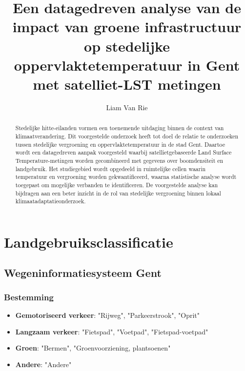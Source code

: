 \documentclass{hogent-article}
\title{Een datagedreven analyse van de impact van groene infrastructuur op stedelijke oppervlaktetemperatuur in Gent met satelliet-LST metingen}
\author{Liam Van Rie}
\begin{document}
\begin{abstract}
  Stedelijke hitte-eilanden vormen een toenemende uitdaging binnen de context van klimaatverandering.
  Dit voorgestelde onderzoek heeft tot doel de relatie te onderzoeken tussen stedelijke vergroening en 
  oppervlaktetemperatuur in de stad Gent. 
  Daartoe wordt een datagedreven aanpak voorgesteld waarbij satellietgebaseerde Land Surface Temperature-metingen
  worden gecombineerd met gegevens over boomdensiteit en landgebruik.
  Het studiegebied wordt opgedeeld in ruimtelijke cellen waarin temperatuur en vergroening worden gekwantificeerd, 
  waarna statistische analyse wordt toegepast om mogelijke verbanden te identificeren.
  De voorgestelde analyse kan bijdragen aan een beter inzicht in de rol van stedelijke vergroening 
  binnen lokaal klimaatadaptatieonderzoek.
\end{abstract}

\tableofcontents


\printbibliography[heading=bibintoc]


\newpage

\appendix

\section{Landgebruiksclassificatie}
\label{app:landgebruik}

\subsection{Wegeninformatiesysteem Gent}

\subsubsection{Bestemming}
\begin{itemize}
    \item \textbf{Gemotoriseerd verkeer}: "Rijweg", "Parkeerstrook", "Oprit"
    \item \textbf{Langzaam verkeer}: "Fietspad", "Voetpad", "Fietspad-voetpad"
    \item \textbf{Groen}: "Bermen", "Groenvoorziening, plantsoenen"
    \item \textbf{Andere}: "Andere"
\end{itemize}
\end{document}
